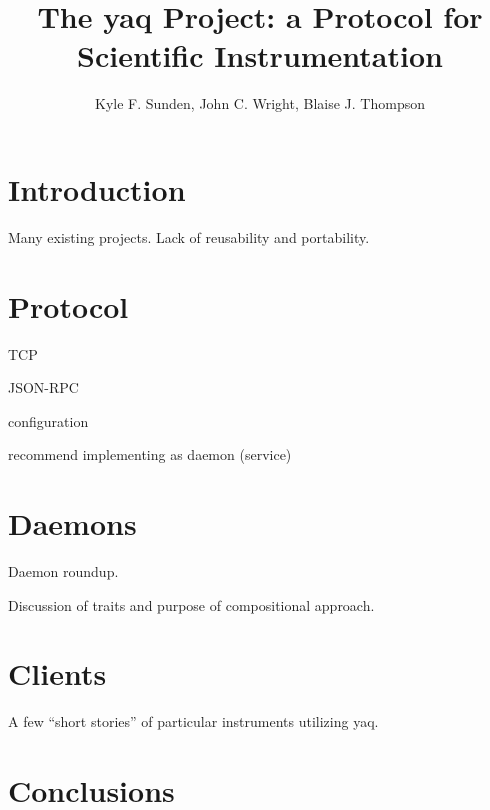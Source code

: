 \documentclass{article}
\title{The yaq Project: a Protocol for Scientific Instrumentation}
\author{Kyle F. Sunden,
  John C. Wright,
  Blaise J. Thompson}
\begin{document}
\maketitle

\section{Introduction}

Many existing projects.
Lack of reusability and portability.

\section{Protocol}

TCP

JSON-RPC

configuration

recommend implementing as daemon (service)

\section{Daemons}

Daemon roundup.

Discussion of traits and purpose of compositional approach.

\section{Clients}

A few ``short stories'' of particular instruments utilizing yaq.

\section{Conclusions}
\end{document}
